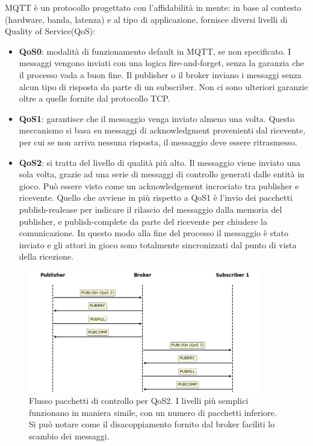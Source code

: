 MQTT è un protocollo progettato con l'affidabilità in mente: in base al contesto (hardware, banda, latenza) e al tipo di applicazione, fornisce diversi livelli di Quality of Service(QoS):

\begin{itemize}
	\item \textbf{QoS0}: modalità di funzionamento default in MQTT, se non specificato. I messaggi vengono inviati con una logica fire-and-forget, senza la garanzia che il processo vada a buon fine. Il publisher o il broker inviano i messaggi senza alcun tipo di risposta da parte di un subscriber. Non ci sono ulteriori garanzie oltre a quelle fornite dal protocollo TCP.
	\item \textbf{QoS1}: garantisce che il messaggio venga inviato almeno una volta. Questo meccanismo si basa su messaggi di acknowledgment provenienti dal ricevente, per cui se non arriva nessuna risposta, il messaggio deve essere ritrasmesso.
	\item \textbf{QoS2}: si tratta del livello di qualità più alto. Il messaggio viene inviato una sola volta, grazie ad una serie di messaggi di controllo generati dalle entità in gioco. Può essere visto come un acknowledgement incrociato tra publisher e ricevente. Quello che avviene in più rispetto a QoS1 è l'invio dei pacchetti publish-realease per indicare il rilascio del messaggio dalla memoria del publisher, e publish-complete da parte del ricevente per chiudere la comunicazione. In questo modo alla fine del processo il messaggio è stato inviato e gli attori in gioco sono totalmente sincronizzati dal punto di vista della ricezione.   
\end{itemize}

\begin{figure}[htbp]
    \centering
    \includegraphics[width=0.9\textwidth]{figures/qos2.png}
    \caption{Flusso pacchetti di controllo per QoS2. I livelli più semplici funzionano in maniera simile, con un numero di pacchetti inferiore. Si può notare come il disacoppiamento fornito dal broker faciliti lo scambio dei messaggi.}
    \label{fig:qos2}
\end{figure}





